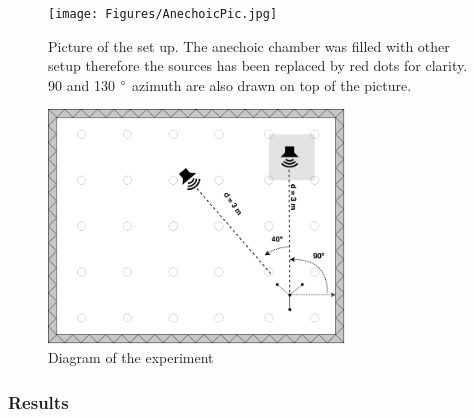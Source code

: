 \begin{figure}[H]
    \centering
    \texttt{[image: Figures/AnechoicPic.jpg]}
    \caption{Picture of the set up. The anechoic chamber was filled with other setup therefore the sources has been replaced by red dots for clarity. 90 and 130 $\degree$ azimuth are also drawn on top of the picture.}
    \label{fig:Anechoicpic1}
\end{figure}

\begin{figure}[H]
    \centering
    \includegraphics[width=0.7\textwidth]{Figures/Anechoicexp3.png}
    \caption{Diagram of the experiment}
    \label{fig:Anechoicexp3}
\end{figure}

\subsubsection{Results}


